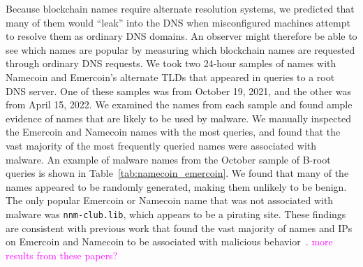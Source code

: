 \documentclass[conference]{IEEEtran}
\newcommand{\randall}{\ding{110}\ding{43}\textcolor{magenta}}
\newcommand{\randall}{}
\begin{document}
Because blockchain names require alternate resolution systems, we predicted 
that many of them would ``leak'' into the DNS when misconfigured machines 
attempt to resolve them as ordinary DNS domains. An observer might therefore be 
able to see which names are popular by measuring which blockchain names are 
requested through ordinary DNS requests. We took two 24-hour samples of names 
with Namecoin and Emercoin's alternate TLDs that appeared in 
queries to a root DNS server. One of these samples was from October 19, 2021, 
and the other was from April 15, 2022. We examined the names from each sample 
and found ample evidence of names that are likely to be used by malware. We manually inspected 
the Emercoin and Namecoin names with the most queries, and found that the vast majority of the most 
frequently queried names were associated with malware. An example of malware names from the October 
sample of B-root queries is shown in Table~\ref{tab:namecoin_emercoin}. We found that many of the 
names appeared to be randomly generated, making them unlikely to be benign. The only popular Emercoin 
or Namecoin name that was not associated with malware was \texttt{nnm-club.lib}, which appears to be a 
pirating site. These findings are consistent with previous work that found the vast majority of names 
and IPs on Emercoin and Namecoin to be associated with malicious 
behavior~\cite{patsakis_unravelling_2020, casino_unearthing_2021}. \randall{more results from these 
papers?}


\end{document}
